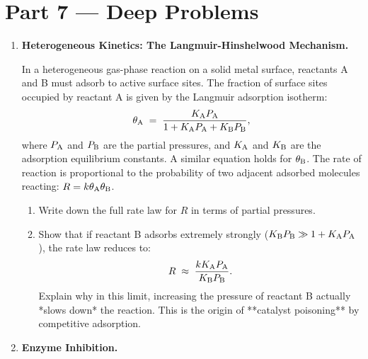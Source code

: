 \documentclass[12pt, a4paper]{book}
\begin{document}
\newpage

\section{Part 7 --- Deep Problems}

\begin{deepbox}
\begin{enumerate}[label=\textbf{D\arabic*.}]
  \item \textbf{Heterogeneous Kinetics: The Langmuir-Hinshelwood Mechanism.}
  
        In a heterogeneous gas-phase reaction on a solid metal surface, reactants A and B must adsorb to active surface sites.
        The fraction of surface sites occupied by reactant A is given by the Langmuir adsorption isotherm:
        \[
          \theta_{\ce{A}} \;=\; \frac{K_{\ce{A}} P_{\ce{A}}}{1 + K_{\ce{A}} P_{\ce{A}} + K_{\ce{B}} P_{\ce{B}}},
        \]
        where $P_{\ce{A}}$ and $P_{\ce{B}}$ are the partial pressures, and $K_{\ce{A}}$ and $K_{\ce{B}}$ are the adsorption equilibrium constants. A similar equation holds for $\theta_{\ce{B}}$.
        The rate of reaction is proportional to the probability of two adjacent adsorbed molecules reacting: $R = k \theta_{\ce{A}} \theta_{\ce{B}}$.
        \begin{enumerate}[label=(\alph*)]
          \item Write down the full rate law for $R$ in terms of partial pressures.
          \item Show that if reactant B adsorbs extremely strongly ($K_{\ce{B}} P_{\ce{B}} \gg 1 + K_{\ce{A}} P_{\ce{A}}$), the rate law reduces to:
          \[
            R \;\approx\; \frac{k K_{\ce{A}} P_{\ce{A}}}{K_{\ce{B}} P_{\ce{B}}}.
          \]
          Explain why in this limit, increasing the pressure of reactant B actually *slows down* the reaction. This is the origin of **catalyst poisoning** by competitive adsorption.
        \end{enumerate}

  \item \textbf{Enzyme Inhibition.}
  

\end{enumerate}
\end{deepbox}
\end{document}
